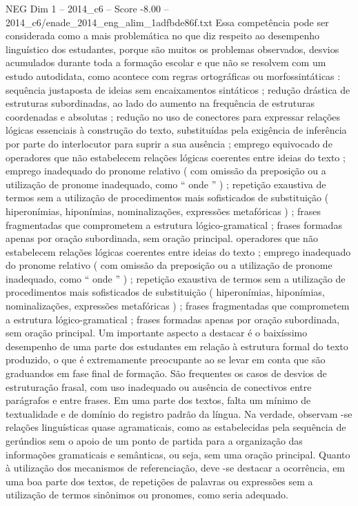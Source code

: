 \begin{textsample}{NEG Dim 1 – 2014\_c6 – Score -8.00 – 2014\_c6/enade\_2014\_eng\_alim\_1adfbde86f.txt}
Essa competência pode ser considerada como a mais problemática no que diz respeito ao desempenho linguístico dos estudantes, porque são muitos os problemas observados, desvios acumulados durante toda a formação escolar e que não se resolvem com um estudo autodidata, como acontece com regras ortográficas ou morfossintáticas : sequência justaposta de ideias sem encaixamentos sintáticos ; redução drástica de estruturas subordinadas, ao lado do aumento na frequência de estruturas coordenadas e absolutas ; redução no uso de conectores para expressar relações lógicas essenciais à construção do texto, substituídas pela exigência de inferência por parte do interlocutor para suprir a sua ausência ; emprego equivocado de operadores que não estabelecem relações lógicas coerentes entre ideias do texto ; emprego inadequado do pronome relativo ( com omissão da preposição ou a utilização de pronome inadequado, como “ onde ” ) ; repetição exaustiva de termos sem a utilização de procedimentos mais sofisticados de substituição ( hiperonímias, hiponímias, nominalizações, expressões metafóricas ) ; frases fragmentadas que comprometem a estrutura lógico-gramatical ; frases formadas apenas por oração subordinada, sem oração principal. operadores que não estabelecem relações lógicas coerentes entre ideias do texto ; emprego inadequado do pronome relativo ( com omissão da preposição ou a utilização de pronome inadequado, como “ onde ” ) ; repetição exaustiva de termos sem a utilização de procedimentos mais sofisticados de substituição ( hiperonímias, hiponímias, nominalizações, expressões metafóricas ) ; frases fragmentadas que comprometem a estrutura lógico-gramatical ; frases formadas apenas por oração subordinada, sem oração principal.
Um importante aspecto a destacar é o baixíssimo desempenho de uma parte dos estudantes em relação à estrutura formal do texto produzido, o que é extremamente preocupante ao se levar em conta que são graduandos em fase final de formação.
São frequentes os casos de desvios de estruturação frasal, com uso inadequado ou ausência de conectivos entre parágrafos e entre frases.
Em uma parte dos textos, falta um mínimo de textualidade e de domínio do registro padrão da língua.
Na verdade, observam -se relações linguísticas quase agramaticais, como as estabelecidas pela sequência de gerúndios sem o apoio de um ponto de partida para a organização das informações gramaticais e semânticas, ou seja, sem uma oração principal.
Quanto à utilização dos mecanismos de referenciação, deve -se destacar a ocorrência, em uma boa parte dos textos, de repetições de palavras ou expressões sem a utilização de termos sinônimos ou pronomes, como seria adequado.

\end{textsample}
